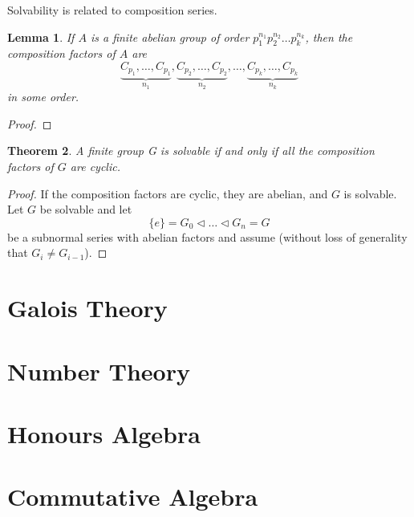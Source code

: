 \documentclass[12pt]{report}
\newtheorem{theorem}{Theorem}[section] %
\newtheorem{lemma}[theorem]{Lemma}
\theoremstyle{definition}
\begin{document}
Solvability is related to composition series.

\begin{lemma}
  If \(A\) is a finite abelian group of order \(p_{1}^{n_{1}} p_{2}^{n_{2}} \ldots p_{k}^{n_{k}}\), then the composition factors of \(A\) are
  \[\underbrace{C_{p_{1}}, \ldots, C_{p_{1}}}_{n_{1}} , \underbrace{C_{p_{2}}, \ldots, C_{p_{2}}}_{n_{2}} , \ldots , \underbrace{C_{p_{k}}, \ldots, C_{p_{k}}}_{n_{k}}\]
  in some order.
\end{lemma}

\begin{proof}

\end{proof}

\begin{theorem}
  A finite group G is solvable if and only if all the composition factors of \(G\) are cyclic.
\end{theorem}

\begin{proof}
  If the composition factors are cyclic, they are abelian, and \(G\) is solvable. Let \(G\) be solvable and let
  \[\{e\} = G_{0} \triangleleft \ldots \triangleleft G_{n} = G\]
  be a subnormal series with abelian factors and assume (without loss of generality that \(G_{i} \neq G_{i-1}\)).
\end{proof}










\chapter{Galois Theory}\label{cha:galois-theory}

\chapter{Number Theory}\label{cha:intr-numb-theory}

\chapter{Honours Algebra}\label{cha:honours-algebra}

\chapter{Commutative Algebra}\label{cha:commutative-algebra}
\end{document}
